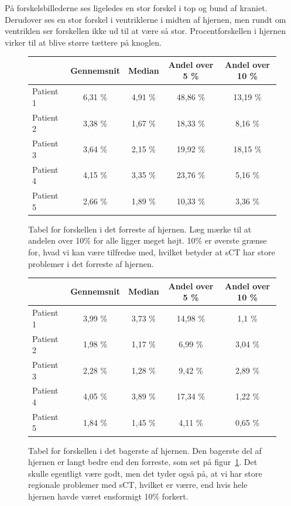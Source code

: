 På forskelsbillederne ses ligeledes en stor forskel i top og bund af
kraniet. Derudover ses en stor forskel i ventriklerne i midten af
hjernen, men rundt om ventriklen ser forskellen ikke ud til at være så
stor. Procentforskellen i hjernen virker til at blive større tættere
på knoglen.


\begin{figure}[H]
    \centering
    \begin{tabular}{| l | c | c | c | c |}
        \hline
         & Gennemsnit & Median & Andel over 5 \% & Andel over 10 \% \\ \hline
        Patient 1 & 6,31 \% & 4,91 \% & 48,86 \% & 13,19 \% \\ \hline
        Patient 2 & 3,38 \% & 1,67 \% & 18,33 \% & 8,16 \% \\ \hline
        Patient 3 & 3,64 \% & 2,15 \% & 19,92 \% & 18,15 \% \\ \hline
        Patient 4 & 4,15 \% & 3,35 \% & 23,76 \% & 5,16 \% \\ \hline
        Patient 5 & 2,66 \% & 1,89 \% & 10,33 \% & 3,36 \% \\ \hline
    \end{tabular}
    \caption{Tabel for forskellen i det forreste af hjernen. Læg mærke til at andelen over 10\% for alle ligger meget højt. 10\% er øverste grænse for, hvad vi kan være tilfredse med, hvilket betyder at sCT har store problemer i det forreste af hjernen.}
    \label{tab:loocv_forresthjerne}
\end{figure}

\begin{figure}[H]
    \centering
    \begin{tabular}{| l | c | c | c | c |}
        \hline
         & Gennemsnit & Median & Andel over 5 \% & Andel over 10 \% \\ \hline
        Patient 1 & 3,99 \% & 3,73 \% & 14,98 \% & 1,1 \% \\ \hline
        Patient 2 & 1,98 \% & 1,17 \% & 6,99 \% & 3,04 \% \\ \hline
        Patient 3 & 2,28 \% & 1,28 \% & 9,42 \% & 2,89 \% \\ \hline
        Patient 4 & 4,05 \% & 3,89 \% & 17,34 \% & 1,22 \% \\ \hline
        Patient 5 & 1,84 \% & 1,45 \% & 4,11 \% & 0,65 \% \\ \hline
    \end{tabular}
    \caption{Tabel for forskellen i det bagerste af hjernen. Den bagerste del af hjernen er langt bedre end den forreste, som set på figur~\ref{tab:loocv_forresthjerne}. Det skulle egentligt være godt, men det tyder også på, at vi har store regionale problemer med sCT, hvilket er værre, end hvis hele hjernen havde været ensformigt 10\% forkert.}
    \label{tab:loocv_bagersthjerne}
\end{figure}

